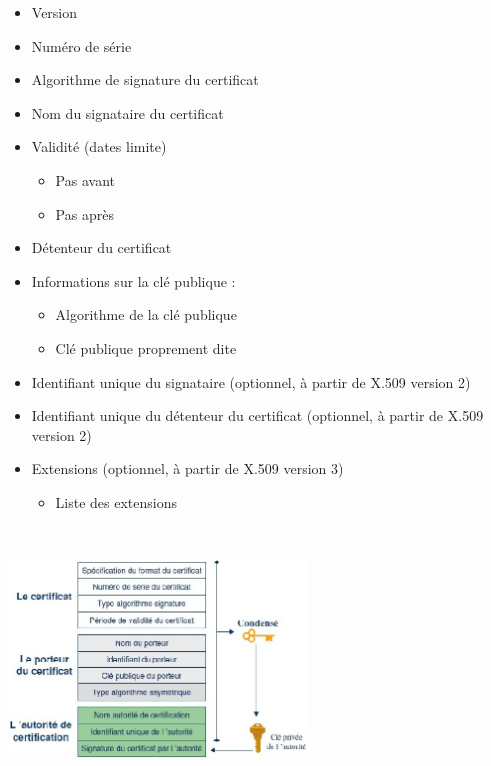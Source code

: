 \begin{minipage}{.4\linewidth}
\begin{itemize}
\item Version
\item Numéro de série
\item Algorithme de signature du certificat
\item Nom du signataire du certificat
\item Validité (dates limite) 
  \begin{itemize} 
  \item Pas avant
  \item Pas après
  \end{itemize}
\item Détenteur du certificat
\item Informations sur la clé publique :
  \begin{itemize}
  \item Algorithme de la clé publique
  \item Clé publique proprement dite
  \end{itemize}
\item Identifiant unique du signataire (optionnel, à partir de X.509 version 2)
\item Identifiant unique du détenteur du certificat (optionnel, à partir de X.509 version 2)
\item Extensions (optionnel, à partir de X.509 version 3)
  \begin{itemize}
  \item Liste des extensions
  \end{itemize}
\end{itemize}
\end{minipage}\hfill
\begin{minipage}{.4\linewidth}
\includegraphics[width=8cm, height=7cm]{./images/cert.jpg}
\end{minipage}


